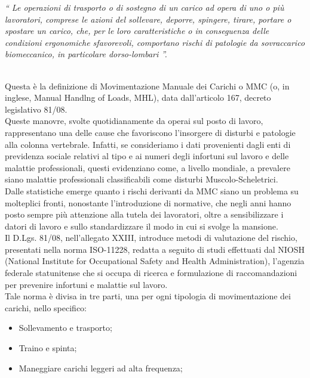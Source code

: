 \documentclass[a4paper]{article}
\begin{document}
\begin{addmargin}[1.5cm]{0cm}
\end{addmargin}
\begin{addmargin}{1.5cm}
\textit{“ Le operazioni di trasporto o di sostegno di un carico ad opera di uno o più
lavoratori, comprese le azioni del sollevare, deporre, spingere, tirare, portare o
spostare un carico, che, per le loro caratteristiche o in conseguenza delle
condizioni ergonomiche sfavorevoli, comportano rischi di patologie da
sovraccarico biomeccanico, in particolare dorso-lombari ”.} \\ \\
\end{addmargin}
Questa è la definizione di Movimentazione Manuale dei Carichi o MMC (o, in inglese, Manual Handlng of Loads, MHL), data dall'articolo 167, decreto legislativo 81/08. \\ Queste manovre, svolte quotidianamente da operai sul posto di lavoro, rappresentano una delle cause che favoriscono l’insorgere di disturbi e patologie alla colonna vertebrale. Infatti, se consideriamo i dati provenienti dagli enti di previdenza sociale relativi al tipo e ai numeri degli infortuni sul lavoro e delle malattie professionali, questi evidenziano come, a livello mondiale, a prevalere siano malattie professionali classificabili come disturbi Muscolo-Scheletrici. \\
Dalle statistiche emerge quanto i rischi derivanti da MMC siano un problema su molteplici fronti, nonostante l'introduzione di normative, che negli anni hanno posto sempre più attenzione alla tutela dei lavoratori, oltre a sensibilizzare i datori di lavoro e sullo standardizzare il modo in cui si svolge la mansione. \\
Il D.Lgs. 81/08, nell’allegato XXIII, introduce metodi di valutazione del rischio, presentati nella norma ISO-11228, redatta a seguito di studi effettuati dal NIOSH (National Institute for Occupational Safety and Health Administration), l’agenzia federale statunitense che si occupa di ricerca e formulazione di raccomandazioni per prevenire infortuni e malattie sul lavoro. \\
Tale norma è divisa in tre parti, una per ogni tipologia di movimentazione dei carichi, nello specifico:
\begin{itemize}
\item Sollevamento e trasporto;
\item Traino e spinta;
\item Maneggiare carichi leggeri ad alta frequenza;
\end{itemize}
\end{document}
